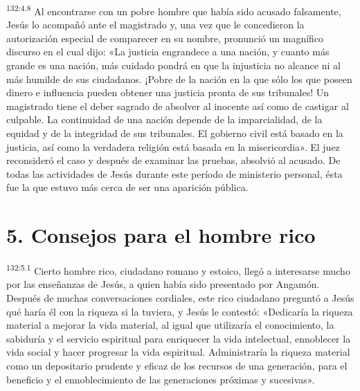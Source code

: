 \par
\textsuperscript{132:4.8} Al encontrarse con un pobre hombre que había sido acusado falsamente, Jesús lo acompañó ante el magistrado y, una vez que le concedieron la autorización especial de comparecer en su nombre, pronunció un magnífico discurso en el cual dijo: «La justicia engrandece a una nación, y cuanto más grande es una nación, más cuidado pondrá en que la injusticia no alcance ni al más humilde de sus ciudadanos. ¡Pobre de la nación en la que sólo los que poseen dinero e influencia pueden obtener una justicia pronta de sus tribunales! Un magistrado tiene el deber sagrado de absolver al inocente así como de castigar al culpable. La continuidad de una nación depende de la imparcialidad, de la equidad y de la integridad de sus tribunales. El gobierno civil está basado en la justicia, así como la verdadera religión está basada en la misericordia». El juez reconsideró el caso y después de examinar las pruebas, absolvió al acusado. De todas las actividades de Jesús durante este período de ministerio personal, ésta fue la que estuvo más cerca de ser una aparición pública.

\section*{5. Consejos para el hombre rico}
\par
\textsuperscript{132:5.1} Cierto hombre rico, ciudadano romano y estoico, llegó a interesarse mucho por las enseñanzas de Jesús, a quien había sido presentado por Angamón. Después de muchas conversaciones cordiales, este rico ciudadano preguntó a Jesús qué haría él con la riqueza si la tuviera, y Jesús le contestó: «Dedicaría la riqueza material a mejorar la vida material, al igual que utilizaría el conocimiento, la sabiduría y el servicio espiritual para enriquecer la vida intelectual, ennoblecer la vida social y hacer progresar la vida espiritual. Administraría la riqueza material como un depositario prudente y eficaz de los recursos de una generación, para el beneficio y el ennoblecimiento de las generaciones próximas y sucesivas».

